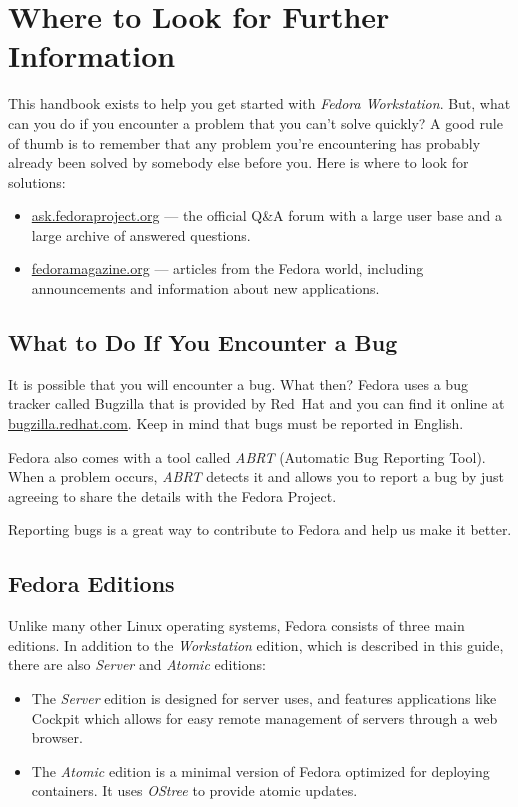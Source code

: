 \chapter*{Where to Look for Further Information}

This handbook exists to help you get started with \emph{Fedora Workstation}. But, what can you do if you encounter a problem that you can't solve quickly? A good rule of thumb is to remember that any problem you're encountering has probably already been solved by somebody else before you. Here is where to look for solutions:
\begin{itemize}
\item\url{ask.fedoraproject.org} --- the official Q\&A forum with a large user base and a large archive of answered questions.

\item\url{fedoramagazine.org} --- articles from the Fedora world, including announcements and information about new applications.
\end{itemize}

\section*{What to Do If You Encounter a Bug}

It is possible that you will encounter a bug. What then? Fedora uses a bug tracker called Bugzilla that is provided by Red~Hat and you can find it online at \url{bugzilla.redhat.com}. Keep in mind that bugs must be reported in English.

Fedora also comes with a tool called \emph{ABRT} (Automatic Bug Reporting Tool). When a problem occurs, \emph{ABRT} detects it and allows you to report a bug by just agreeing to share the details with the Fedora Project.

Reporting bugs is a great way to contribute to Fedora and help us make it better.

\section*{Fedora Editions}

Unlike many other Linux operating systems, Fedora consists of three main editions. In addition to the \emph{Workstation} edition, which is described in this guide, there are also \emph{Server} and \emph{Atomic} editions:
\begin{itemize}
\item The \emph{Server} edition is designed for server uses, and features applications like Cockpit which allows for easy remote management of servers through a web browser.

\item The \emph{Atomic} edition is a minimal version of Fedora optimized for deploying containers. It uses \emph{OStree} to provide atomic updates.
\end{itemize}

